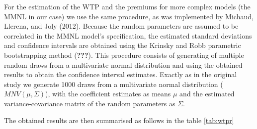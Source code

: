 \documentclass[11pt,]{article}
\begin{document}
For the estimation of the WTP and the premiums for more complex models
(the MMNL in our case) we use the same procedure, as was implemented by
Michaud, Llerena, and Joly (2012). Because the random parameters are
assumed to be correlated in the MMNL model's specification, the
estimated standard deviations and confidence intervals are obtained
using the Krinsky and Robb parametric bootstrapping method
({\textbf{???}}). This procedure consists of generating of multiple
random draws from a multivariate normal distribution and using the
obtained results to obtain the confidence interval estimates. Exactly as
in the original study we generate 1000 draws from a multivariate normal
distribution (\(MNV(\mu, \Sigma)\)), with the coefficient estimates as
means \(\mu\) and the estimated variance-covariance matrix of the random
parameters as \(\Sigma\).

The obtained results are then summarised as follows in the table
\ref{tab:wtpr}
\end{document}
